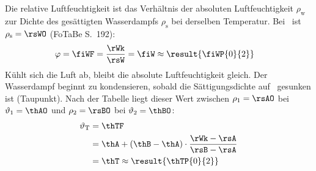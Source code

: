 Die relative Luftfeuchtigkeit ist das Verhältnis der absoluten Luftfeuchtigkeit $\rho_\text{w}$ zur Dichte des gesättigten Wasserdampfs $\rho_\text{s}$ bei derselben Temperatur. Bei \thWO\ ist $\rho_\text{s} = \rsWO$ (FoTaBe S.~192):
\begin{align}
 \varphi &= \fiWF = \frac{\rWk}{\rsW} = \fiW \approx \result{\fiWP{0}{2}}
\end{align}
Kühlt sich die Luft ab, bleibt die absolute Luftfeuchtigkeit gleich. Der Wasserdampf beginnt zu kondensieren, sobald die Sättigungsdichte auf \rWkO\ gesunken ist (Taupunkt). Nach der Tabelle liegt dieser Wert zwischen $\rho_1 = \rsAO$ bei $\vartheta_1 = \thAO$ und $\rho_2 = \rsBO$ bei $\vartheta_2 = \thBO$:
\begin{align}
 \vartheta_\text{T} &= \thTF \\
   &= \thA + \left(\thB-\thA\right)\cdot\frac{\rWk-\rsA}{\rsB-\rsA} \\
   &= \thT \approx \result{\thTP{0}{2}}
\end{align}
